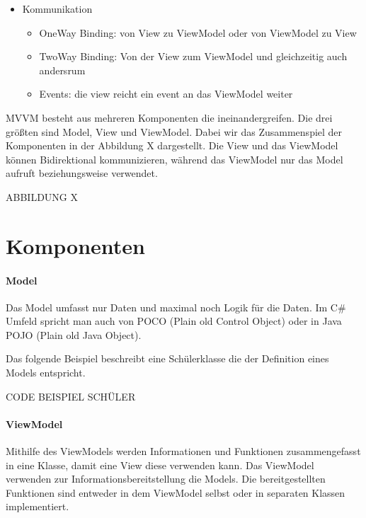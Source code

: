\documentclass[titlepage=false,12pt]{scrreprt}
\begin{document}
\begin{itemize}
	\item Kommunikation
	      \begin{itemize}
	      	\item OneWay Binding: von View zu ViewModel oder von ViewModel zu View
	      	\item TwoWay Binding: Von der View zum ViewModel und gleichzeitig auch andersrum
	      	\item Events: die view reicht ein event an das ViewModel weiter 
	      \end{itemize}
\end{itemize}

MVVM besteht aus mehreren Komponenten die ineinandergreifen. Die drei 
größten sind Model, View und ViewModel. Dabei wir das Zusammenspiel 
der Komponenten in der Abbildung X dargestellt. Die View und das ViewModel 
können Bidirektional kommunizieren, während das ViewModel nur das Model
aufruft beziehungsweise verwendet.

ABBILDUNG X

\section{Komponenten}

\paragraph{Model}

Das Model umfasst nur Daten und maximal noch Logik für die Daten. 
Im C\# Umfeld spricht man auch von POCO (Plain old Control Object) 
oder in Java POJO (Plain old Java Object).
	
Das folgende Beispiel beschreibt eine Schülerklasse die der Definition 
eines Models entspricht.

CODE BEISPIEL SCHÜLER

\paragraph{ViewModel}

Mithilfe des ViewModels werden Informationen und Funktionen zusammengefasst
in eine Klasse, damit eine View diese verwenden kann. Das ViewModel verwenden zur 
Informationsbereitstellung die Models. Die bereitgestellten Funktionen sind
entweder in dem ViewModel selbst oder in separaten Klassen implementiert.
\end{document}
